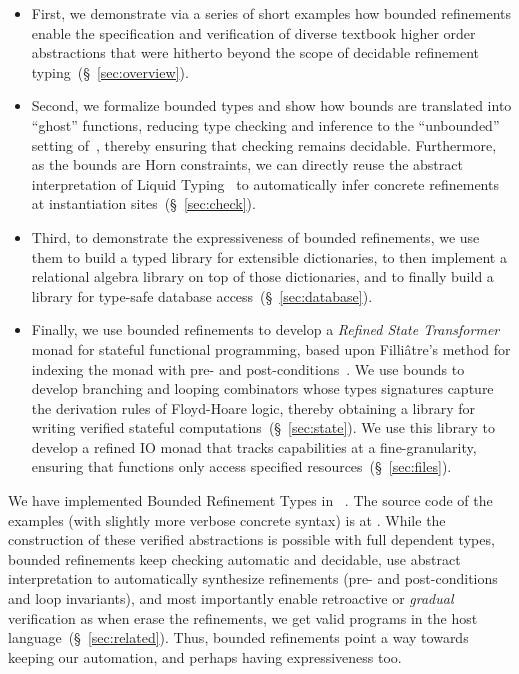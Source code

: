 
\begin{itemize}
\item
First, we demonstrate via a series of short examples how bounded refinements
enable the specification and verification of diverse textbook higher order
abstractions that were hitherto beyond the scope of decidable refinement
typing~(\S~\ref{sec:overview}).

\item
Second, we formalize bounded types and show how bounds are translated
into ``ghost'' functions, reducing type checking and inference to the
``unbounded'' setting of~\cite{vazou13}, thereby ensuring that checking
remains decidable. Furthermore, as the bounds are Horn constraints, we
can directly reuse the abstract interpretation of Liquid Typing~\citep{LiquidPLDI08}
to automatically infer concrete refinements at instantiation
sites~(\S~\ref{sec:check}).

\item
Third, to demonstrate the expressiveness of bounded refinements, we
use them to build a typed library for extensible dictionaries, to
then implement a relational algebra library on top of those
dictionaries, and to finally build a library for type-safe
database access~(\S~\ref{sec:database}).

\item
Finally, we use bounded refinements to develop a \emph{Refined State Transformer}
monad for stateful functional programming, based upon Filli\^atre's method
for indexing the monad with pre- and post-conditions~\citep{Filliatre98}.
%
We use bounds to develop branching and looping combinators whose types
signatures capture the derivation rules of Floyd-Hoare logic, thereby
obtaining a library for writing verified stateful computations~(\S~\ref{sec:state}).
%
We use this library to develop a refined IO monad that tracks capabilities
at a fine-granularity, ensuring that functions only access specified
resources~(\S~\ref{sec:files}).
\end{itemize}

We have implemented Bounded Refinement Types in \toolname~\citep{LiquidICFP14}.
The source code of the examples (with slightly more verbose concrete syntax)
is at \cite{liquidhaskellgithub}.
%
While the construction of these verified abstractions is possible with full
dependent types, bounded refinements
%
keep checking automatic and decidable,
%
use abstract interpretation to automatically synthesize
refinements (\ie pre- and post-conditions and loop invariants),
and most importantly
%
enable retroactive or \emph{gradual} verification as when
erase the refinements, we get valid programs in the
host language~(\S~\ref{sec:related}).
%
%
Thus, bounded refinements point a way towards keeping our automation, and
perhaps having expressiveness too.
%
